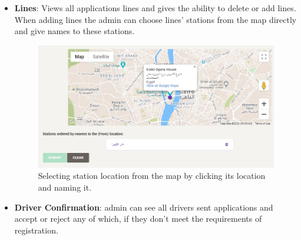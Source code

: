 \begin{itemize}
\item\textbf{Lines}: Views all applications lines and gives the ability to delete or add lines. When adding lines the admin can choose lines’ stations from the map directly and give names to these stations.	
\newline
\begin{figure}[htp]%
    \center%
    \includegraphics[width=1\textwidth]{images/ch5/fig3.jpg}%
    \caption[Selecting station location from the map by clicking its location and naming it.]{Selecting station location from the map by clicking its location and naming it.}\label{fig:fig3}%
  \end{figure}
\newline
\item\textbf{Driver Confirmation}: admin can see all drivers sent applications and accept or reject any of which, if they don’t meet the requirements of registration.
\end{itemize}


